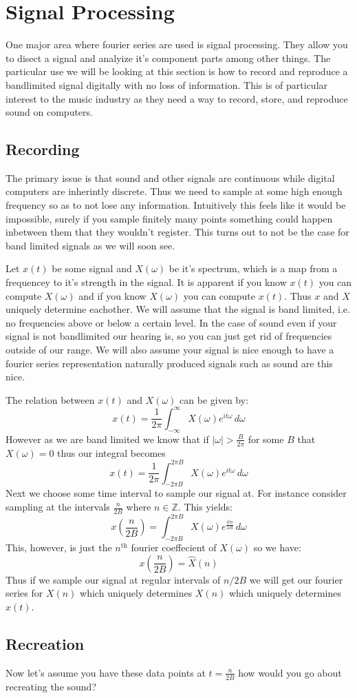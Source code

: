 \documentclass [../article.tex]{subfiles}
\begin{document}
  \section{Signal Processing}
  One major area where fourier series are used is signal
  processing. They allow you to disect a signal and analyize
  it's component parts among other things. The particular use
  we will be looking at this section is how to record and reproduce
  a bandlimited signal digitally with no loss of information.
  This is of particular interest to the music industry as they
  need a way to record, store, and reproduce sound on computers.

  \subsection{Recording}
  The primary issue is that sound and other signals are continuous
  while digital computers are inherintly discrete. Thus we need
  to sample at some high enough frequency so as to not lose any
  information. Intuitively this feels like it would be impossible,
  surely if you sample finitely many points something could happen
  inbetween them that they wouldn't register. This turns out to not
  be the case for band limited signals as we will soon see.

  Let $x(t)$ be some signal and $X(\omega)$ be it's
  spectrum, which is a map from a frequencey to it's
  strength in the signal. It is apparent if you know $x(t)$
  you can compute $X(\omega)$ and if you know $X(\omega)$
  you can compute $x(t)$. Thus $x$ and $X$ uniquely determine
  eachother.
  We will assume that the signal is band limited, i.e. no
  frequencies above or below a certain level. In the case of
  sound even if your signal is not bandlimited our hearing is,
  so you can just get rid of frequencies outside of our range.
  We will also assume your signal is nice enough to have a
  fourier series representation naturally produced signals such
  as sound are this nice.

  The relation between $x(t)$ and $X(\omega)$ can be given by:
  \[x(t) = \frac{1}{2\pi}\int_{-\infty}^\infty
  X(\omega)e^{it\omega}\,d\omega\]
  However as we are band limited we know that if
  $|\omega| > \frac{B}{2\pi}$ for some $B$ that
  $X(\omega) = 0$ thus our integral becomes
  \[x(t) = \frac{1}{2\pi}\int_{-2\pi B}^{2\pi B}
  X(\omega)e^{it\omega}\,d\omega\]
  Next we choose some time interval to sample our signal at.
  For instance consider sampling at the intervals $\frac{n}{2B}$
  where $n \in \mathbb{Z}$. This yields:
  \[x\left(\frac{n}{2B}\right) =
  \int_{-2\pi B}^{2\pi B}X(\omega)e^{\frac{itn}{2B}}\,d\omega\]
  This, however, is just the $n^{\text{th}}$ fourier coeffecient
  of $X(\omega)$ so we have:
  \[x\left(\frac{n}{2B}\right) = \hat{X}(n)\]
  Thus if we sample our signal at regular intervals of
  $n/2B$ we will get our fourier series for $X(n)$ which
  uniquely determines $X(n)$ which uniquely determines $x(t)$.

  \subsection{Recreation}
  Now let's assume you have these data points at $t=\frac{n}{2B}$
  how would you go about recreating the sound?
  
\end{document}
